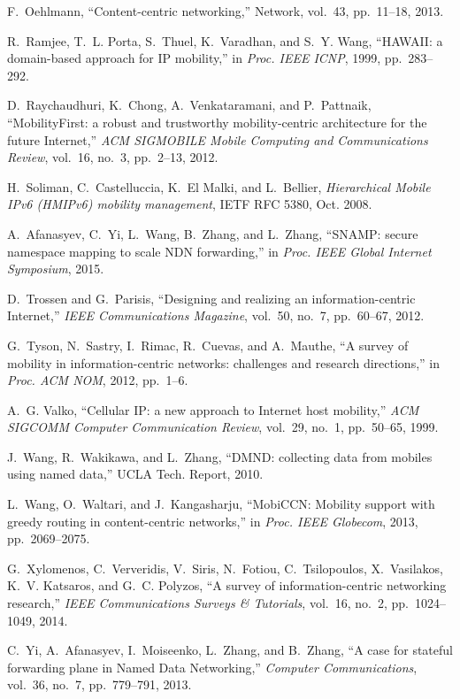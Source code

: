 \begin{thebibliography}{99}
F.~Oehlmann,
``Content-centric networking,''
Network,
vol.~43, pp.~11--18, 2013.

R.~Ramjee, T.~L. Porta, S.~Thuel, K.~Varadhan, and S.~Y. Wang,
``HAWAII: a domain-based approach for IP mobility,''
in \textit{Proc. IEEE ICNP},
1999, pp.~283--292.

D.~Raychaudhuri, K.~Chong, A.~Venkataramani, and P.~Pattnaik,
``MobilityFirst: a robust and trustworthy mobility-centric architecture for the future Internet,''
\textit{ACM SIGMOBILE Mobile Computing and Communications Review},
vol.~16, no.~3, pp.~2--13, 2012.

H.~Soliman, C.~Castelluccia, K.~El Malki, and L.~Bellier,
\textit{Hierarchical Mobile IPv6 (HMIPv6) mobility management},
IETF RFC 5380, Oct. 2008.

A.~Afanasyev, C.~Yi, L.~Wang, B.~Zhang, and L.~Zhang,
``SNAMP: secure namespace mapping to scale NDN forwarding,''
in \textit{Proc. IEEE Global Internet Symposium},
2015.

D.~Trossen and G.~Parisis,
``Designing and realizing an information-centric Internet,''
\textit{IEEE Communications Magazine},
vol.~50, no.~7, pp.~60--67, 2012.

G.~Tyson, N.~Sastry, I.~Rimac, R.~Cuevas, and A.~Mauthe,
``A survey of mobility in information-centric networks: challenges and research directions,''
in \textit{Proc. ACM NOM},
2012, pp.~1--6.

A.~G. Valko,
``Cellular IP: a new approach to Internet host mobility,''
\textit{ACM SIGCOMM Computer Communication Review},
vol.~29, no.~1, pp.~50--65, 1999.

J.~Wang, R.~Wakikawa, and L.~Zhang,
``DMND: collecting data from mobiles using named data,''
UCLA Tech. Report,
2010.

L.~Wang, O.~Waltari, and J.~Kangasharju,
``MobiCCN: Mobility support with greedy routing in content-centric networks,''
in \textit{Proc. IEEE Globecom},
2013, pp.~2069--2075.

G.~Xylomenos, C.~Ververidis, V.~Siris, N.~Fotiou, C.~Tsilopoulos, X.~Vasilakos,
K.~V. Katsaros, and G.~C. Polyzos,
``A survey of information-centric networking research,''
\textit{IEEE Communications Surveys \& Tutorials},
vol.~16, no.~2, pp.~1024--1049, 2014.

C.~Yi, A.~Afanasyev, I.~Moiseenko, L.~Zhang, and B.~Zhang,
``A case for stateful forwarding plane in Named Data Networking,''
\textit{Computer Communications},
vol.~36, no.~7, pp.~779--791, 2013.


\end{thebibliography}
